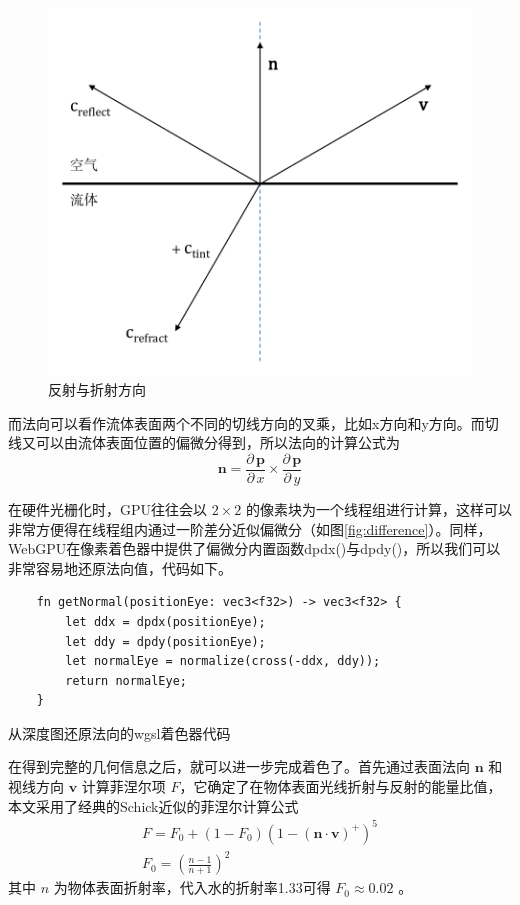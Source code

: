     \begin{figure}
    	\centering
    	\includegraphics[width=.35\textwidth]{figures/rendering/shading.pdf}
    	\caption{反射与折射方向}
    	\label{fig:refraction}
    \end{figure}
    
    而法向可以看作流体表面两个不同的切线方向的叉乘，比如x方向和y方向。而切线又可以由流体表面位置的偏微分得到，所以法向的计算公式为
    \begin{equation}
    	\mathbf{n} = \frac {\partial \, \mathbf{p}} {\partial \, x} \times \frac {\partial \, \mathbf{p}} {\partial \, y}
    \end{equation}
    
    在硬件光栅化时，GPU往往会以 $2\times 2$ 的像素块为一个线程组进行计算，这样可以非常方便得在线程组内通过一阶差分近似偏微分（如图\ref{fig:difference}）。同样，WebGPU在像素着色器中提供了偏微分内置函数dpdx()与dpdy()，所以我们可以非常容易地还原法向值，代码如下。

    \begin{listing}[htbp]
    \begin{verbatim}
    fn getNormal(positionEye: vec3<f32>) -> vec3<f32> {
        let ddx = dpdx(positionEye);
        let ddy = dpdy(positionEye);
        let normalEye = normalize(cross(-ddx, ddy));
        return normalEye;
    }
    \end{verbatim}
    \caption{从深度图还原法向的wgsl着色器代码}
    \label{code:normal}
    \end{listing}
    
    在得到完整的几何信息之后，就可以进一步完成着色了。首先通过表面法向 $\mathbf{n}$ 和视线方向 $\mathbf{v}$ 计算菲涅尔项 $F$，它确定了在物体表面光线折射与反射的能量比值，本文采用了经典的Schick近似的菲涅尔计算公式\cite{S94BRDF}
    \begin{equation}
    	\begin{gathered}
    	F = F_0 + (1 - F_0) (1 - (\mathbf{n} \cdot \mathbf{v})^+)^5 
    	\\
    	F_0 = (\frac{n - 1}{n + 1})^2
    	\end{gathered}
    \end{equation}
    其中 $n$ 为物体表面折射率，代入水的折射率1.33可得 $F_0 \approx 0.02$ 。
    
